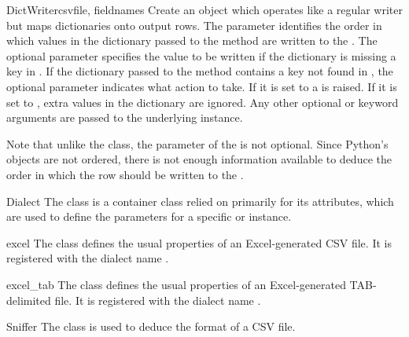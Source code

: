 \begin{classdesc}{DictWriter}{csvfile, fieldnames}
Create an object which operates like a regular writer but maps dictionaries
onto output rows.  The  parameter identifies the order in
which values in the dictionary passed to the  method are
written to the .  The optional  parameter
specifies the value to be written if the dictionary is missing a key in
.  If the dictionary passed to the 
method contains a key not found in , the optional
 parameter indicates what action to take.  If it is set
to  a  is raised.  If it is set to
, extra values in the dictionary are ignored.  Any other
optional or keyword arguments are passed to the underlying 
instance.

Note that unlike the  class, the 
parameter of the  is not optional.  Since Python's
 objects are not ordered, there is not enough information
available to deduce the order in which the row should be written to the
.

\end{classdesc}

\begin{classdesc*}{Dialect}{}
The  class is a container class relied on primarily for its
attributes, which are used to define the parameters for a specific
 or  instance.
\end{classdesc*}

\begin{classdesc}{excel}{}
The  class defines the usual properties of an Excel-generated
CSV file.  It is registered with the dialect name .
\end{classdesc}

\begin{classdesc}{excel_tab}{}
The  class defines the usual properties of an
Excel-generated TAB-delimited file.  It is registered with the dialect name
.
\end{classdesc}

\begin{classdesc}{Sniffer}{}
The  class is used to deduce the format of a CSV file.
\end{classdesc}


